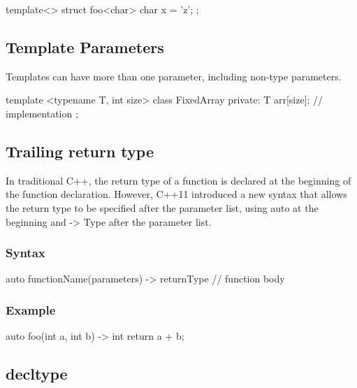 \documentclass{report}
\begin{document}
\begin{concept}
\begin{cppcode}
    template<>
    struct foo<char> {
        char x = 'z';
    };
    \end{cppcode}

    \bigbreak \noindent 
    \subsection{Template Parameters}
    \bigbreak \noindent 
    \begin{concept}
        Templates can have more than one parameter, including non-type parameters.
    \end{concept}
    \bigbreak \noindent 
    \begin{cppcode}
        template <typename T, int size>
        class FixedArray {
            private:
            T arr[size];
            // implementation
        };
    \end{cppcode}

    \bigbreak \noindent 
    \subsection{Trailing return type}
    \bigbreak \noindent 
    In traditional C++, the return type of a function is declared at the beginning of the function declaration. However, C++11 introduced a new syntax that allows the return type to be specified after the parameter list, using auto at the beginning and -> Type after the parameter list.
    \bigbreak \noindent 
    \subsubsection{Syntax}
    \bigbreak \noindent 
    \begin{cppcode}
    auto functionName(parameters) -> returnType {
        // function body
    }
    \end{cppcode}

    \bigbreak \noindent 
    \subsubsection{Example}
    \bigbreak \noindent 
    \begin{cppcode}
    auto foo(int a, int b) -> int {
        return a + b;
    }
    \end{cppcode}

    \bigbreak \noindent 
    \subsection{decltype}


\end{concept}
\end{document}
